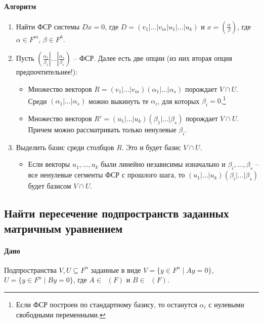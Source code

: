 \documentclass{article}
\newcommand{\MatrixDim}[3]{\mathop{\mathrm{M}_{#2\,#3}}(#1)}
\begin{document}
\paragraph{Алгоритм}
\begin{enumerate}
\item Найти ФСР системы $D x = 0$, где $D = (v_1|\ldots|v_m|u_1|\ldots|u_k)$ и $x = \left(\frac{\alpha}{\beta}\right)$, где $\alpha\in F^{m}$, $\beta\in F^{k}$.

\item Пусть $\left(\left.\left.\frac{\alpha_1}{\beta_1}\right|\ldots\right|\frac{\alpha_s}{\beta_s}\right)$ -- ФСР.  Далее есть две опции (из них вторая опция предпочтительнее!):
\begin{itemize}
\item Множество векторов $R = (v_1|\ldots|v_m)(\alpha_1|\ldots|\alpha_s)$ порождает $V\cap U$. Среди $(\alpha_1|\ldots|\alpha_s)$ можно выкинуть те $\alpha_i$, для которых $\beta_i = 0$.\footnote{Если ФСР построен по стандартному базису, то останутся $\alpha_i$ с нулевыми свободными переменными.}

\item Множество векторов $R' = (u_1|\ldots|u_k)(\beta_1|\ldots|\beta_s)$ порождает  $V\cap U$. Причем можно рассматривать только ненулевые $\beta_i$.

\end{itemize}

\item Выделить базис среди столбцов $R$. Это и будет базис $V\cap U$.
\begin{itemize}
\item Если векторы $u_1,\ldots,u_k$ были линейно независимы изначально и $\beta_i,\ldots,\beta_s$ -- все ненулевые сегменты ФСР с прошлого шага, то $(u_1|\ldots|u_k)(\beta_i|\ldots|\beta_s)$ будет базисом $V\cap U$.
\end{itemize}
\end{enumerate}


\subsection{Найти пересечение подпространств заданных матричным уравнением}

\paragraph{Дано}

Подпространства $V,U\subseteq F^{n}$ заданные в виде $V = \{y\in F^{n}\mid Ay = 0\}$, $U = \{y\in F^{n}\mid By = 0\}$, где $A\in \MatrixDim{F}{m}{n}$ и $B\in \MatrixDim{F}{k}{n}$.
\end{document}
